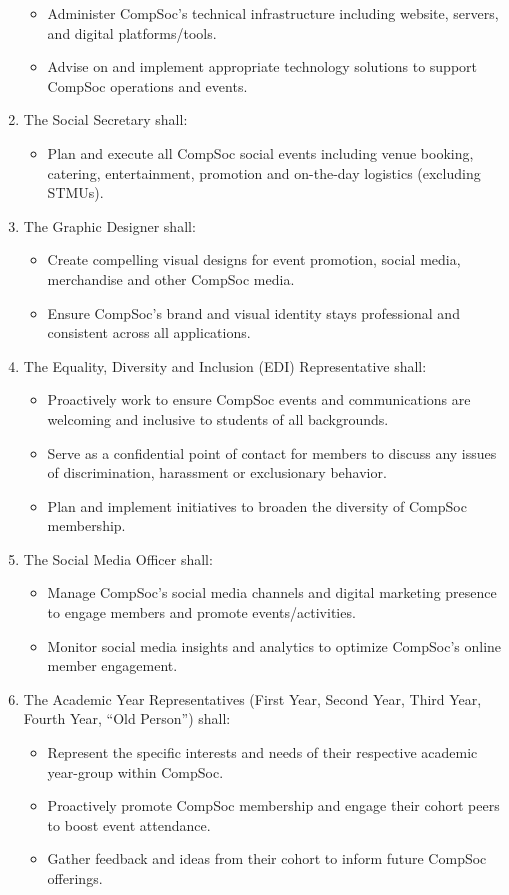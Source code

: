\begin{enumerate}
\begin{itemize}
        \item Administer CompSoc's technical infrastructure including website, servers, and digital platforms/tools.
        \item Advise on and implement appropriate technology solutions to support CompSoc operations and events.  
    \end{itemize}
    \item The Social Secretary shall:
    \begin{itemize}
        \item Plan and execute all CompSoc social events including venue booking, catering, entertainment, promotion and on-the-day logistics (excluding STMUs).
    \end{itemize}
    \item The Graphic Designer shall: 
    \begin{itemize}
        \item Create compelling visual designs for event promotion, social media, merchandise and other CompSoc media.
        \item Ensure CompSoc's brand and visual identity stays professional and consistent across all applications.
    \end{itemize}
    \item The Equality, Diversity and Inclusion (EDI) Representative shall:
    \begin{itemize}
        \item Proactively work to ensure CompSoc events and communications are welcoming and inclusive to students of all backgrounds. 
        \item Serve as a confidential point of contact for members to discuss any issues of discrimination, harassment or exclusionary behavior.
        \item Plan and implement initiatives to broaden the diversity of CompSoc membership.  
    \end{itemize}
    \item The Social Media Officer shall:  
    \begin{itemize}
        \item Manage CompSoc's social media channels and digital marketing presence to engage members and promote events/activities.
        \item Monitor social media insights and analytics to optimize CompSoc's online member engagement.
    \end{itemize}
    \item The Academic Year Representatives (First Year, Second Year, Third Year, Fourth Year, ``Old Person'') shall:
    \begin{itemize}
        \item Represent the specific interests and needs of their respective academic year-group within CompSoc.
        \item Proactively promote CompSoc membership and engage their cohort peers to boost event attendance.  
        \item Gather feedback and ideas from their cohort to inform future CompSoc offerings.
    \end{itemize}
\end{enumerate}

